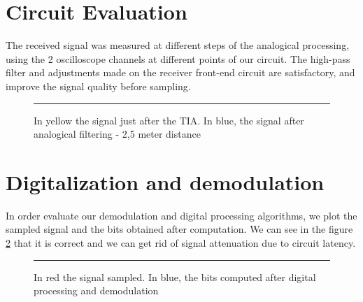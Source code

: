 \section{Circuit Evaluation}

The received signal was measured at different steps of the analogical processing, using the 2 oscilloscope channels at different points of our circuit. The high-pass filter and adjustments made on the receiver front-end circuit are satisfactory, and improve the signal quality before sampling.

\begin{figure}[htbp]
	\centering
		\rule{35em}{0.5pt}
		\caption[In yellow the signal just after the TIA. In blue, the signal after analogical filtering - 2,5 meter distance]{In yellow the signal just after the TIA. In blue, the signal after analogical filtering - 2,5 meter distance}
		\label{fig:circuit-compare}
	\end{figure}
	
\section{Digitalization and demodulation}

In order evaluate our demodulation and digital processing algorithms, we plot the sampled signal and the bits obtained after computation. We can see in the figure \ref{fig:numeric} that it is correct and we can get rid of signal attenuation due to circuit latency.
\begin{figure}[htbp]
	\centering
		\rule{35em}{0.5pt}
		\caption{In red the signal sampled. In blue, the bits computed after digital processing and demodulation}
		\label{fig:numeric}
	\end{figure}

